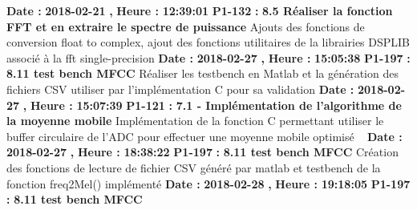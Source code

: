 \documentclass{article}%
\begin{document}
\newline%
%
\textbf{Date : }%
\textbf{2018{-}02{-}21}%
\textbf{,}%
\textbf{ Heure : }%
\textbf{12:39:01}%
\newline%
%
\textbf{P1{-}132 }%
\textbf{ : }%
\textbf{ 8.5 Réaliser la fonction FFT et en extraire le spectre de puissance}%
\newline%
\newline%
%
Ajouts des fonctions de conversion float to complex,\newline%
ajout des fonctions utilitaires de la librairies DSPLIB associé à la fft single{-}precision\newline%
\newline%
%
\textbf{Date : }%
\textbf{2018{-}02{-}27}%
\textbf{,}%
\textbf{ Heure : }%
\textbf{15:05:38}%
\newline%
%
\textbf{P1{-}197 }%
\textbf{ : }%
\textbf{ 8.11 test bench MFCC}%
\newline%
\newline%
%
Réaliser les testbench en Matlab et la génération des fichiers CSV utiliser par l'implémentation C pour sa validation\newline%
\newline%
%
\textbf{Date : }%
\textbf{2018{-}02{-}27}%
\textbf{,}%
\textbf{ Heure : }%
\textbf{15:07:39}%
\newline%
%
\textbf{P1{-}121 }%
\textbf{ : }%
\textbf{ 7.1 {-} Implémentation de l'algorithme de la moyenne mobile}%
\newline%
\newline%
%
Implémentation de la fonction C permettant utiliser le buffer circulaire de l'ADC pour effectuer une moyenne mobile optimisé\newline%
~\newline%
\newline%
%
\textbf{Date : }%
\textbf{2018{-}02{-}27}%
\textbf{,}%
\textbf{ Heure : }%
\textbf{18:38:22}%
\newline%
%
\textbf{P1{-}197 }%
\textbf{ : }%
\textbf{ 8.11 test bench MFCC}%
\newline%
\newline%
%
Création des fonctions de lecture de fichier CSV généré par matlab et testbench de la fonction freq2Mel() implémenté\newline%
\newline%
%
\textbf{Date : }%
\textbf{2018{-}02{-}28}%
\textbf{,}%
\textbf{ Heure : }%
\textbf{19:18:05}%
\newline%
%
\textbf{P1{-}197 }%
\textbf{ : }%
\textbf{ 8.11 test bench MFCC}%
\end{document}
